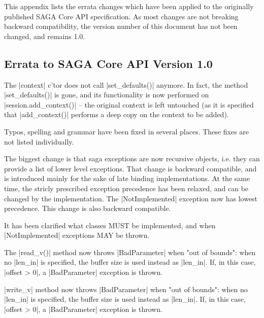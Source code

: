 
  This appendix lists the errata changes which have been applied to
  the originally published SAGA Core API specification.  As most
  changes are not breaking backward compatibility, the version number
  of this document has not been changed, and remains 1.0.


  \subsection*{Errata to SAGA Core API Version 1.0}

  \begin{shortlist}

  \item The |context| c'tor does not call |set_defaults()| anymore.
  In fact, the method |set_defaults()| is gone, and its functionality
  is now performed on |session.add_context()| -- the original context
  is left untouched (as it is specified that |add_context()| performs
  a deep copy on the context to be added).  
  
  
  \item Typos, spelling and grammar have been fixed in several
  places.  These fixes are not listed individually.

  \item The biggest change is that saga exceptions are now
  recursive objects, i.e. they can provide a list of lower
  level exceptions.  That change is backward compatible, and
  is introduced mainly for the sake of late binding
  implementations.  At the same time, the stricly prescribed
  exception precedence has been relaxed, and can be changed by
  the implementation.  The |NotImplemented| exception now has
  lowest precedence.  This change is also backward compatible.

  \item It has been clarified what \LF classes MUST be implemented,
  and when |NotImplemented| exceptions MAY be thrown.

  \item The |read_v()| method now throws |BadParameter| when "out of
  bounds": when  no |len_in| is specified, the buffer size is used
  instead as |len_in|.  If, in this case, |offset > 0|, a
  |BadParameter| exception is thrown.

  \item |write_v| method now throws |BadParameter| when "out of
  bounds": when  no |len_in| is specified, the buffer size is used
  instead as |len_in|.  If, in this case, |offset > 0|, a
  |BadParameter| exception is thrown.


\end{shortlist}
